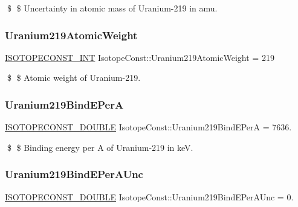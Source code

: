 \$ \$ Uncertainty in atomic mass of Uranium-\/219 in amu. \mbox{\label{group___isotope_const-_uranium-_u219_ga6e77620a7d31d2f3f53faa1c7d02b795}} 
\subsubsection{\texorpdfstring{Uranium219\+Atomic\+Weight}{Uranium219AtomicWeight}}
{\footnotesize\ttfamily \mbox{\hyperlink{group___isotope_const-_macros_ga5f18360b3e99483a35c32d789e62621c}{I\+S\+O\+T\+O\+P\+E\+C\+O\+N\+S\+T\+\_\+\+I\+NT}} Isotope\+Const\+::\+Uranium219\+Atomic\+Weight = 219}

\$ \$ Atomic weight of Uranium-\/219. \mbox{\label{group___isotope_const-_uranium-_u219_ga485a6cc3b8aed4742d2b865bf8f37022}} 
\subsubsection{\texorpdfstring{Uranium219\+Bind\+E\+PerA}{Uranium219BindEPerA}}
{\footnotesize\ttfamily \mbox{\hyperlink{group___isotope_const-_macros_ga8f45a7272ce02c0b4c65c44636ed719a}{I\+S\+O\+T\+O\+P\+E\+C\+O\+N\+S\+T\+\_\+\+D\+O\+U\+B\+LE}} Isotope\+Const\+::\+Uranium219\+Bind\+E\+PerA = 7636.}

\$ \$ Binding energy per A of Uranium-\/219 in keV. \mbox{\label{group___isotope_const-_uranium-_u219_ga86ba7cd5548b8d5fa94d59ad913ca361}} 
\subsubsection{\texorpdfstring{Uranium219\+Bind\+E\+Per\+A\+Unc}{Uranium219BindEPerAUnc}}
{\footnotesize\ttfamily \mbox{\hyperlink{group___isotope_const-_macros_ga8f45a7272ce02c0b4c65c44636ed719a}{I\+S\+O\+T\+O\+P\+E\+C\+O\+N\+S\+T\+\_\+\+D\+O\+U\+B\+LE}} Isotope\+Const\+::\+Uranium219\+Bind\+E\+Per\+A\+Unc = 0.}

